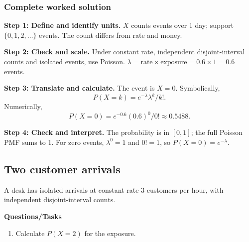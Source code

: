 \subsubsection*{Complete worked solution}
\par\noindent\begin{minipage}{\linewidth}
\textbf{Step 1: Define and identify units.} $X$ counts events over 1 day; support $\{0,1,2,\ldots\}$ events. The count differs from rate and money.
\end{minipage}\par\medskip
\par\noindent\begin{minipage}{\linewidth}
\textbf{Step 2: Check and scale.} Under constant rate, independent disjoint-interval counts and isolated events, use Poisson. $\lambda=\text{rate}\times\text{exposure}=0.6\times1=0.6$ events.
\end{minipage}\par\medskip
\par\noindent\begin{minipage}{\linewidth}
\textbf{Step 3: Translate and calculate.} The event is $ X=0$. Symbolically,
\[P(X=k)=e^{-\lambda}\lambda^k/k!.\]
Numerically,
\[P(X=0)=e^{-0.6}(0.6)^0/0!\approx 0.5488.\]
\end{minipage}\par\medskip
\par\noindent\begin{minipage}{\linewidth}
\textbf{Step 4: Check and interpret.} The probability is in $[0,1]$; the full Poisson PMF sums to 1. For zero events, $\lambda^0=1$ and $0!=1$, so $P(X=0)=e^{-\lambda}$. 
\end{minipage}\par\medskip
{}
\subsection{Two customer arrivals}
A desk has isolated arrivals at constant rate 3 customers per hour, with independent disjoint-interval counts.

\textbf{Questions/Tasks}
\begin{enumerate}
\item Calculate $P(X=2)$ for the exposure. 
\end{enumerate}
